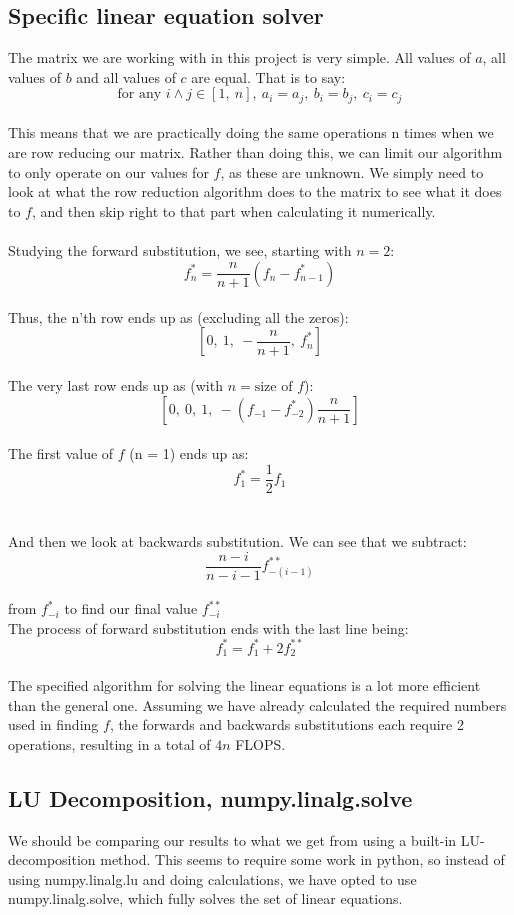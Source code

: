 \documentclass[a4paper,12pt,norsk]{article}
\begin{document}
	\subsection{Specific linear equation solver}
	The matrix we are working with in this project is very simple. All values of $a$, all values of $b$ and all values of $c$ are equal. That is to say: 
	$$\text{for any }i \wedge j \in [1,\ n],\ a_i = a_j,\ b_i = b_j,\ c_i = c_j$$\\
	This means that we are practically doing the same operations n times when we are row reducing our matrix. Rather than doing this, we can limit our algorithm to only operate on our values for $f$, as these are unknown. We simply need to look at what the row reduction algorithm does to the matrix to see what it does to $f$, and then skip right to that part when calculating it numerically.\\
	\\
	Studying the forward substitution, we see, starting with $n = 2$:
	$$f_n^* = \frac{n}{n+1}(f_n - f_{n-1}^*) $$\\
	Thus, the n'th row ends up as (excluding all the zeros):
	$$[0,\ 1,\ -\frac{n}{n+1},\ f_n^*] $$\\
	The very last row ends up as (with $n = \text{size of $f$}$):
	$$[0,\ 0,\ 1,\ -(f_{-1}-f^*_{-2})\frac{n}{n+1}] $$\\
	The first value of $f$ (n = 1) ends up as:
	$$f_1^* = \frac{1}{2}f_1 $$\\
	\\
	And then we look at backwards substitution. We can see that we subtract:
	$$\frac{n-i}{n-i-1}f^{**}_{-(i-1)} $$\\
	from $f^*_{-i}$ to find our final value $f_{-i}^{**}$\\
	The process of forward substitution ends with the last line being:
	$$f^*_1 = f^*_1 + 2f_2^{**} $$\\

	The specified algorithm for solving the linear equations is a lot more efficient than the general one. Assuming we have already calculated the required numbers used in finding $f$, the forwards and backwards substitutions each require 2 operations, resulting in a total of $4n$ FLOPS.

	\subsection{LU Decomposition, numpy.linalg.solve}
	We should be comparing our results to what we get from using a built-in LU-decomposition method. This seems to require some work in python, so instead of using numpy.linalg.lu and doing calculations, we have opted to use numpy.linalg.solve, which fully solves the set of linear equations.
	
\end{document}
